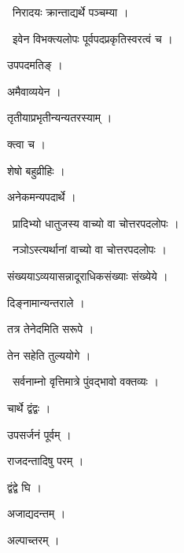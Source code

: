 \documentclass[10pt, openany, oneside]{book}
\begin{document}
\par\noindent\hspace{1.5em}{\vps वा॰}~{\qt निरादयः क्रान्ताद्यर्थे पञ्चम्या ।}

\par\noindent\hspace{1.5em}{\vps वा॰}~{\qt इवेन विभक्त्यलोपः पूर्वपदप्रकृतिस्वरत्वं च ।}

\noindent उपपदमतिङ् ।

\noindent अमैवाव्ययेन ।

\noindent तृतीयाप्रभृतीन्यन्यतरस्याम् ।

\noindent क्त्वा च ।

\noindent शेषो बहुव्रीहिः ।

\noindent अनेकमन्यपदार्थे ।

\par\noindent\hspace{1.5em}{\vps वा॰}~{\qt प्रादिभ्यो धातुजस्य वाच्यो वा चोत्तरपदलोपः ।}

\par\noindent\hspace{1.5em}{\vps वा॰}~{\qt नञोऽस्त्यर्थानां वाच्यो वा चोत्तरपदलोपः ।}

\noindent संख्ययाऽव्ययासन्नादूराधिकसंख्याः संख्येये ।

\noindent दिङ्नामान्यन्तराले ।

\noindent तत्र तेनेदमिति सरूपे ।

\noindent तेन सहेति तुल्ययोगे ।

\par\noindent\hspace{1.5em}{\vps वा॰}~{\qt सर्वनाम्नो वृत्तिमात्रे पुंवद्भावो वक्तव्यः ।}

\noindent चार्थे द्वंद्वः ।

\noindent उपसर्जनं पूर्वम् ।

\noindent राजदन्तादिषु परम् ।

\noindent द्वंद्वे घि ।

\noindent अजाद्यदन्तम् ।

\noindent अल्पाच्तरम् ।
\end{document}
